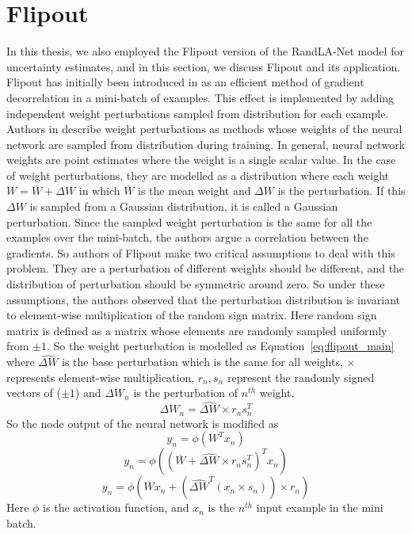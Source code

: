 \section{Flipout}
\label{sec:meth_flipout}
In this thesis, we also employed the Flipout version of the RandLA-Net model for uncertainty estimates, and in this section, we discuss Flipout and its application.
Flipout has initially been introduced in \cite{Flipout} as an efficient method of gradient decorrelation in a mini-batch of examples.
This effect is implemented by adding independent weight perturbations sampled from distribution for each example.
Authors in \cite{Flipout} describe weight perturbations as methods whose weights of the neural network are sampled from distribution during training.
In general, neural network weights are point estimates where the weight is a single scalar value. In the case of weight perturbations, they are modelled as a distribution where each weight $W=\overline{W}+\Delta W$ in which $\overline{W}$ is the mean weight and $\Delta W$ is the perturbation.
If this $\Delta W$ is sampled from a Gaussian distribution, it is called a Gaussian perturbation.
Since the sampled weight perturbation is the same for all the examples over the mini-batch, the authors argue a correlation between the gradients.
So authors of Flipout make two critical assumptions to deal with this problem. 
They are a perturbation of different weights should be different, and the distribution of perturbation should be symmetric around zero.
So under these assumptions, the authors observed that the perturbation distribution is invariant to element-wise multiplication of the random sign matrix.
Here random sign matrix is defined as a matrix whose elements are randomly sampled uniformly from $\pm 1$. 
So the weight perturbation is modelled as Equation~\ref{eq:flipout_main} where $\widehat{\Delta W}$ is the base perturbation which is the same for all weights, $\times$ represents element-wise multiplication, $r_n, s_n$ represent the randomly signed vectors of ($\pm 1$) and $\Delta W_n$ is the perturbation of $n^{th}$ weight.
\begin{equation}
    \Delta W_n = \widehat{\Delta W} \times r_n s_{n}^T
    \label{eq:flipout_main}
\end{equation}
So the node output of the neural network is modified as 
$$y_n = \phi(W^T x_n) $$
$$y_n = \phi((\overline{W}+\widehat{\Delta W} \times r_n s_{n}^T)^Tx_n)$$
$$y_n = \phi(\overline{W} x_n+(\widehat{\Delta W}^T (x_n\times s_{n}))\times r_n)$$
Here $\phi$ is the activation function, and $x_n$ is the $n^{th}$ input example in the mini batch.

